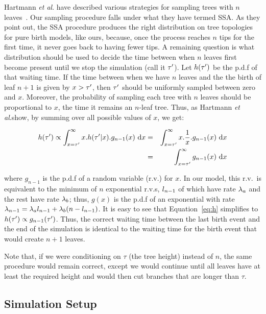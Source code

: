 Hartmann \textit{et al}. have described various strategies for sampling trees with $n$ leaves~\cite{Hartmann2010}. Our sampling procedure falls under what they have termed \gls{SSA}. As they point out, the \gls{SSA} procedure produces the right distribution on tree topologies for pure birth models, like ours, because, once the process reaches $n$ tips for the first time, it never goes back to having fewer tips. A remaining question is what distribution should be used to decide the time between when $n$ leaves first become present until we stop the simulation (call it $\tau'$). Let $h(\tau')$ be the p.d.f of that waiting time. If the time between when we have $n$ leaves and the the birth of leaf $n+1$ is given by $x>\tau'$, then $\tau'$ should be uniformly sampled between zero and $x$. Moreover, the probability of sampling each tree with $n$ leaves should be proportional to $x$, the time it remains an $n$-leaf tree. Thus, as Hartmann \textit{et al}.show, by summing over all possible values of $x$, we get:
\begin{small}
\begin{eqnarray}\label{eq:h}
h(\tav) \propto \int_{x=\tav}^{\infty} x.h(\tav|x).g_{n-1}(x) \ \mathrm{d}x &=& \int_{x=\tav}^{\infty} x.\frac{1}{x}.g_{n-1}(x) \ \mathrm{d}x  \nonumber \\ 
&=& \int_{x=\tav}^{\infty} g_{n-1}(x) \ \mathrm{d}x
\end{eqnarray}
\end{small}
where $g_{n-1}$ is the p.d.f of a random variable (r.v.) for $x$. In our model, this r.v.\ is equivalent to the minimum of $n$ exponential r.v.s, $l_{n-1}$ of which have rate $\lambda_a$ and the rest have rate $\lambda_b$; thus, $g(x)$ is the p.d.f of an exponential with rate $\lambda_{n-1}=\lambda_a l_{n-1}+\lambda_b(n-l_{n-1})$. It is easy to see that Equation~\ref{eq:h} simplifies to $h(\tau')\propto g_{n-1}(\tau')$. Thus, the correct waiting time between the last birth event and the end of the simulation is identical to the waiting time for the birth event that would create $n+1$ leaves.

Note that, if we were conditioning on $\tau$ (the tree height) instead of $n$, the same procedure would remain correct, except we would continue until all leaves have at least the required height and would then cut branches that are longer than $\tau$.

\subsection{Simulation Setup}
